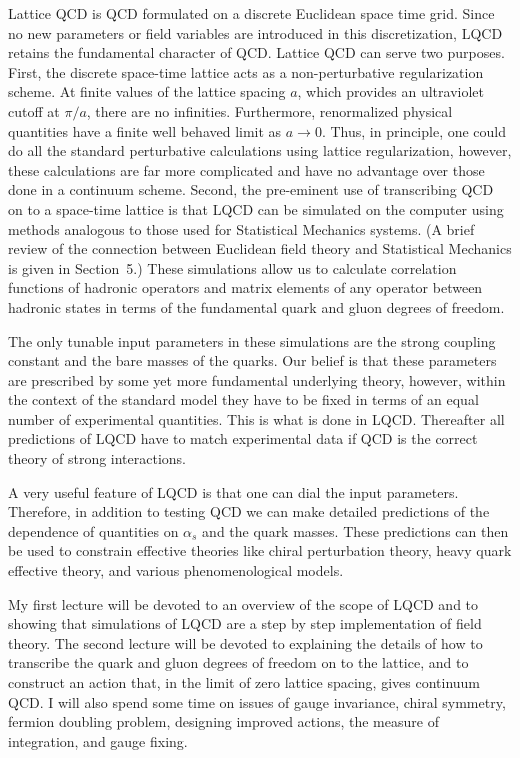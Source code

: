 Lattice QCD is QCD formulated on a discrete Euclidean space time grid.
Since no new parameters or field variables are introduced in this
discretization, LQCD retains the fundamental character of QCD. Lattice QCD
can serve two purposes. First, the discrete space-time lattice acts as a
non-perturbative regularization scheme. At finite values of the lattice
spacing $a$, which provides an ultraviolet cutoff at $\pi/a$, there are no
infinities. Furthermore, renormalized physical quantities have a finite
well behaved limit as $a \to 0$. Thus, in principle, one could do all the
standard perturbative calculations using lattice regularization, however,
these calculations are far more complicated and have no advantage over
those done in a continuum scheme. Second, the pre-eminent use of
transcribing QCD on to a space-time lattice is that LQCD can be simulated
on the computer using methods analogous to those used for Statistical
Mechanics systems. (A brief review of the connection between Euclidean
field theory and Statistical Mechanics is given in Section~5.) These
simulations allow us to calculate correlation functions of hadronic
operators and matrix elements of any operator between hadronic states in
terms of the fundamental quark and gluon degrees of freedom.

The only tunable input parameters in these simulations are the strong
coupling constant and the bare masses of the quarks. Our belief is that
these parameters are prescribed by some yet more fundamental underlying
theory, however, within the context of the standard model they have to be
fixed in terms of an equal number of experimental quantities. This is what
is done in LQCD. Thereafter all predictions of LQCD have to match
experimental data if QCD is the correct theory of strong interactions.

A very useful feature of LQCD is that one can dial the input parameters.
Therefore, in addition to testing QCD we can make detailed predictions of
the dependence of quantities on $\alpha_s$ and the quark masses. These
predictions can then be used to constrain effective theories like chiral
perturbation theory, heavy quark effective theory, and various
phenomenological models.

My first lecture will be devoted to an overview of the scope of LQCD and
to showing that simulations of LQCD are a step by step implementation of
field theory. The second lecture will be devoted to explaining the details
of how to transcribe the quark and gluon degrees of freedom on to the
lattice, and to construct an action that, in the limit of zero lattice
spacing, gives continuum QCD. I will also spend some time on issues of
gauge invariance, chiral symmetry, fermion doubling problem, designing
improved actions, the measure of integration, and gauge fixing.

